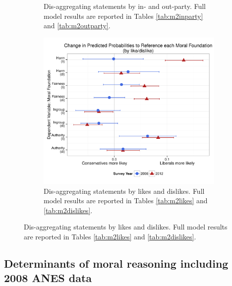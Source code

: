 \documentclass[12pt]{article}
\begin{document}
\begin{figure}[h]
\begin{subfigure}[t]{0.49\textwidth}
\caption{Dis-aggregating statements by in- and out-party. Full model results are reported in Tables \ref{tab:m2inparty} and \ref{tab:m2outparty}.}\label{fig:appD5inout}
  \end{subfigure}
  \begin{subfigure}[t]{0.49\textwidth}
    \includegraphics[scale=.4]{../calc/fig/appD6lidi.pdf}
\caption{Dis-aggregating statements by likes and dislikes. Full model results are reported in Tables \ref{tab:m2likes} and \ref{tab:m2dislikes}.}\label{fig:appD6lidi}
  \end{subfigure}
\end{figure}


\clearpage
\subsection{Determinants of moral reasoning including 2008 ANES data}
\end{document}
